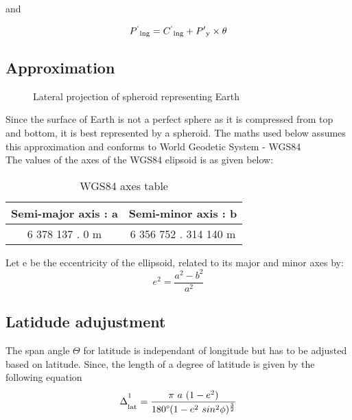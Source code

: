 \documentclass[conference]{IEEEtran}
\begin{document}
and

\begin{equation}P\textsuperscript{`}\textsubscript{lng} = C\textsuperscript{`}\textsubscript{lng} + P'\textsubscript{y} \times \theta\end{equation}

\subsection{Approximation}
\begin{figure}[htbp]
\centerline{}
\caption{Lateral projection of spheroid representing Earth}
\label{Spheroid}
\end{figure}
Since the surface of Earth is not a perfect sphere as it is compressed from top and bottom, it is best represented by a spheroid.
The maths used below assumes this approximation and conforms to World Geodetic System - WGS84\cite{b1}\\
The values of the axes of the WGS84 elipsoid is as given below:
\begin{table}[h!]
\caption{WGS84 axes table}
\begin{center}
\bgroup
\def\arraystretch{1.4}%
\begin{tabular}{c|c}
\textbf{Semi-major axis : a} & \textbf{Semi-minor axis : b} \\
\hline
6 378 137 . 0 m & 6 356 752 . 314 140 m\\
\end{tabular}
\egroup
\end{center} \end{table}

Let e be the eccentricity of the ellipsoid, related to its major and minor axes by:
\begin{equation}e^2 =  \frac{a^2-b^2}{a^2}\end{equation}

\subsection{Latidude adujustment}
The span angle $\Theta$ for latitude is independant of longitude but has to be adjusted based on latitude.
Since, the length of a degree of latitude is given by the following equation\cite{b2}
\begin{equation}\Delta^\textsuperscript{1}_\textsubscript{lat}=\frac{\pi \ a \ (1 - e^2)} {180\degree (1 - e\textsuperscript{2} \ sin\textsuperscript{2}\phi)^\frac{3}{2}}\end{equation}
\end{document}
